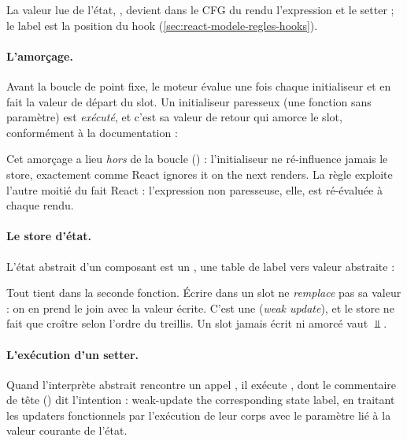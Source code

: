 
La valeur lue de l'état, , devient dans le CFG du rendu l'expression
 et le setter  ;
le label est la position du hook (\cref{sec:react-modele-regles-hooks}).

\paragraph{L'amorçage.} Avant la boucle de point fixe, le moteur évalue une fois
chaque initialiseur et en fait la valeur de départ du slot. Un initialiseur
paresseux (une fonction sans paramètre) est \emph{exécuté}, et c'est sa valeur
de retour qui amorce le slot, conformément à la documentation :


Cet amorçage a lieu \emph{hors} de la boucle () :
l'initialiseur ne ré-influence jamais le store, exactement comme React
\og ignores it on the next renders\fg{}. La règle  exploite
l'autre moitié du fait React : l'expression non paresseuse, elle, est
ré-évaluée à chaque rendu.

\paragraph{Le store d'état.} L'état abstrait d'un composant est un
, une table de label vers valeur abstraite :


Tout tient dans la seconde fonction. Écrire dans un slot ne \emph{remplace}
pas sa valeur : on en prend le join avec la valeur écrite. C'est une
 (\emph{weak update}), et le store ne fait que
croître selon l'ordre du treillis. Un slot jamais écrit ni amorcé vaut
$\Bot$.

\paragraph{L'exécution d'un setter.} Quand l'interprète abstrait rencontre un
appel , il exécute , dont le
commentaire de tête () dit
l'intention : \og weak-update the corresponding state label\fg{}, en traitant
les updaters fonctionnels par l'exécution de leur corps avec le paramètre lié
à la valeur courante de l'état.

